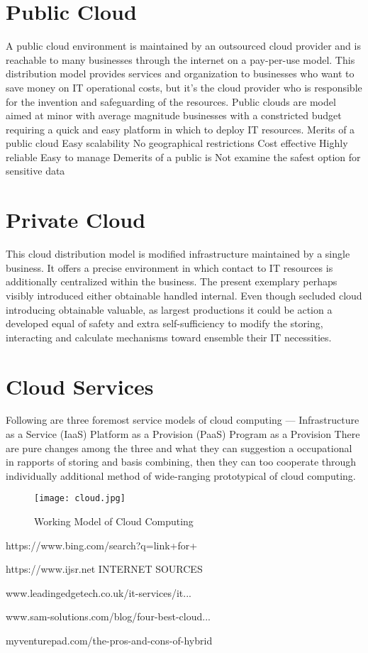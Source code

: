 \documentclass[conference]{IEEEtran}
\begin{document}
\section{Public Cloud}  
A public cloud environment is maintained by an  outsourced  cloud  provider  and  is  reachable  to many businesses through  the internet  on a  pay-per-use model. This distribution model provides services and  organization  to  businesses  who  want  to  save money  on  IT  operational  costs,  but  it’s  the  cloud provider  who  is  responsible  for  the  invention  and safeguarding of the resources. Public clouds are model aimed at minor with average  magnitude  businesses  with  a  constricted budget requiring a quick and easy platform in which to deploy IT resources. Merits of a public cloud Easy scalability No geographical restrictions Cost effective Highly reliable Easy to manage Demerits of a public is Not examine the safest option for sensitive data  \section{Private Cloud}  
This  cloud  distribution model is   modified infrastructure  maintained  by  a  single  business.  It offers a precise environment in  which contact to IT resources  is  additionally  centralized  within  the business.  The  present  exemplary  perhaps  visibly introduced  either  obtainable handled internal. Even though  secluded  cloud  introducing  obtainable valuable,  as largest  productions it could  be action a developed  equal of  safety  and  extra  self-sufficiency to  modify  the  storing,  interacting  and  calculate mechanisms toward ensemble their IT necessities.
\section{Cloud Services}
 Following  are  three  foremost  service  models  of cloud computing —  Infrastructure as a Service (IaaS) Platform as a Provision (PaaS)  Program as a Provision  There are pure changes among the three and what they  can suggestion a occupational  in rapports of  storing  and  basis  combining,  then  they  can  too cooperate through individually additional method  of wide-ranging prototypical of cloud computing.
\begin{figure}[h]
\texttt{[image: cloud.jpg]} \caption{Working Model of Cloud Computing}
\label{fig:Cloud Computing}
\end{figure}
\begin{thebibliography} {}

https://www.bing.com/search?q=link+for+ 

https://www.ijsr.net INTERNET SOURCES 

www.leadingedgetech.co.uk/it-services/it...   

www.sam-solutions.com/blog/four-best-cloud...  

myventurepad.com/the-pros-and-cons-of-hybrid 

\end{thebibliography} 
\end{document}
